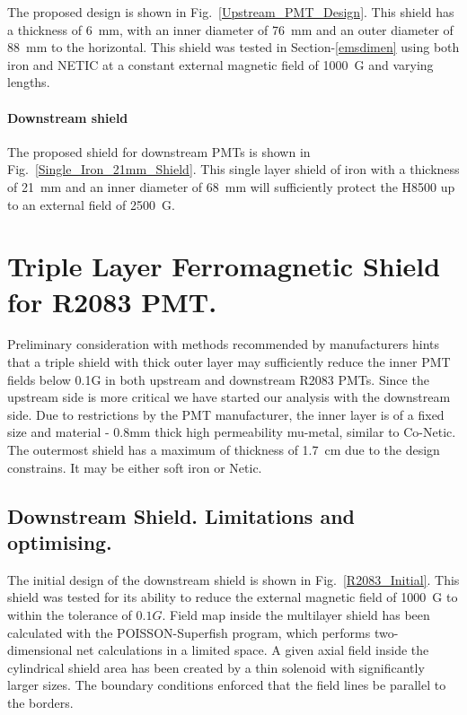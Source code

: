 \documentclass[12pt]{article}
\begin{document}
The proposed design
is shown  in Fig.~\ref{Upstream_PMT_Design}. This  shield has
a thickness of 6~mm, with an inner diameter of 76~mm and an outer 
diameter of 88~mm to the horizontal. This shield  was tested 
in Section-\ref{emsdimen} using both iron and NETIC at a constant
external magnetic field of 1000~G and varying lengths.

\paragraph{Downstream shield}
The proposed shield for  downstream PMTs is shown in
Fig.~\ref{Single_Iron_21mm_Shield}. 
This single layer shield of iron with 
a thickness of 21~mm and an inner diameter of 68~mm will sufficiently protect 
the H8500 up to an external  field of 2500~G. 
\section{Triple Layer Ferromagnetic Shield for R2083 PMT.}
\label{tlfs}
Preliminary consideration with  methods recommended by manufacturers
hints  that  a triple shield with thick outer layer may  sufficiently reduce 
the inner PMT  fields below 0.1G  in both  upstream and downstream R2083 PMTs.
Since the upstream side is  more critical we have started our analysis with the 
downstream  side. Due to restrictions by the  PMT manufacturer, the inner layer 
is of a fixed size and material - 0.8mm thick 
high permeability mu-metal, similar to  Co-Netic. 
The outermost shield has a maximum of thickness of 1.7~cm due to 
the design constrains. It may be either  soft iron or Netic.


\subsection{Downstream Shield. Limitations and  optimising.}

The initial design of  the  downstream  shield  is 
shown  in Fig.~\ref{R2083_Initial}.
This shield  was  tested for its ability to reduce the external magnetic field of 1000~G 
to within the tolerance of $0.1G$. Field map inside the multilayer shield has been 
calculated with  the POISSON-Superfish  program, which performs two-dimensional net 
calculations in a limited space.  A given  axial field inside the cylindrical shield  
area   has been created by a thin solenoid with  significantly larger sizes.
The boundary conditions enforced that the field lines be parallel to the borders.
 
\end{document}
